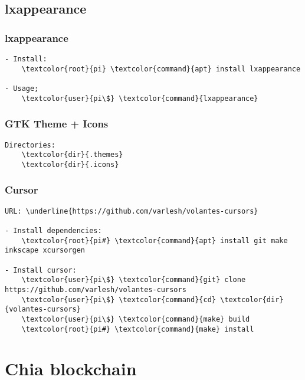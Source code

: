 \documentclass[10pt, a4paper, onecolumn, openany]{book} %
\begin{document}
\section{lxappearance}
\subsection{lxappearance}
\begin{Verbatim}[commandchars=\\\{\}]
- Install:
    \textcolor{root}{pi} \textcolor{command}{apt} install lxappearance
    
- Usage;
    \textcolor{user}{pi\$} \textcolor{command}{lxappearance}
\end{Verbatim}
\subsection{GTK Theme + Icons}
\begin{Verbatim}[commandchars=\\\{\}]
Directories:
    \textcolor{dir}{.themes}
    \textcolor{dir}{.icons}
\end{Verbatim}
\subsection{Cursor}
\begin{Verbatim}[commandchars=\\\{\}]
URL: \underline{https://github.com/varlesh/volantes-cursors}

- Install dependencies:
    \textcolor{root}{pi#} \textcolor{command}{apt} install git make inkscape xcursorgen

- Install cursor:
    \textcolor{user}{pi\$} \textcolor{command}{git} clone https://github.com/varlesh/volantes-cursors
    \textcolor{user}{pi\$} \textcolor{command}{cd} \textcolor{dir}{volantes-cursors}
    \textcolor{user}{pi\$} \textcolor{command}{make} build
    \textcolor{root}{pi#} \textcolor{command}{make} install
\end{Verbatim}


\chapter{Chia blockchain}
\end{document}
